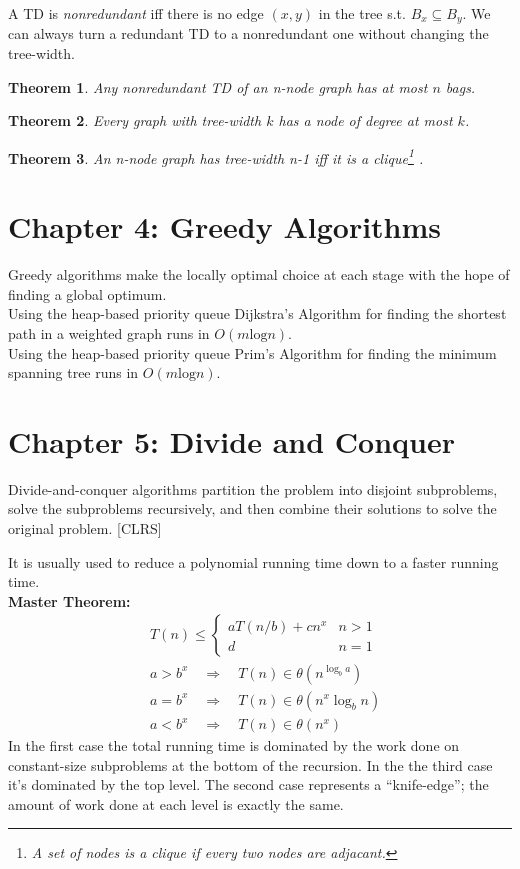 \documentclass{report}
\newtheorem{Theorem}{Theorem}
\begin{document}
A TD is \emph{nonredundant} iff there is no edge $(x,y)$ in the tree s.t. $B_x\subseteq B_y$. We can always turn a redundant TD to a nonredundant one without changing the tree-width.
\begin{Theorem}
	Any nonredundant TD of an n-node graph has at most $n$ bags.
\end{Theorem}
\begin{Theorem}
	Every graph with tree-width $k$ has a node of degree at most $k$.
\end{Theorem}
\begin{Theorem}
	An n-node graph has tree-width n-1 iff it is a clique\footnote{A set of nodes is a \emph{clique} if every two nodes are adjacant.} .
\end{Theorem}

\section*{Chapter 4: Greedy Algorithms}
Greedy algorithms make the locally optimal choice at each stage with the hope of finding a global optimum.\\

Using the heap-based priority queue Dijkstra's Algorithm for finding the shortest path in a weighted graph runs in $O(m\text{log}n)$.\\

Using the heap-based priority queue Prim's Algorithm for finding the minimum spanning tree runs in $O(m\text{log}n)$.
\section*{Chapter 5: Divide and Conquer}
Divide-and-conquer algorithms partition the problem into disjoint subproblems, solve the subproblems recursively, and then combine their solutions to solve the original problem. [CLRS]

It is usually used to reduce a polynomial running time down to a faster running time.\\

\textbf{Master Theorem:}
\begin{align*}
&    T(n)\leq
    \begin{cases}
      aT(n/b)+cn^x & n>1 \\
      d & n=1
    \end{cases}\\
& a>b^x \quad \Rightarrow \quad T(n)\in \theta(n^{\log_ba})\\
& a=b^x \quad \Rightarrow \quad T(n)\in\theta(n^x\log_bn)\\
&a<b^x  \quad \Rightarrow \quad T(n)\in\theta(n^x)
\end{align*}
In the first case the total running time is dominated by the work done on constant-size subproblems at the bottom of the recursion. In the the third case it's dominated by the top level. The second case represents a 
``knife-edge''; the amount of work done at each level is exactly the same.\\
\end{document}
